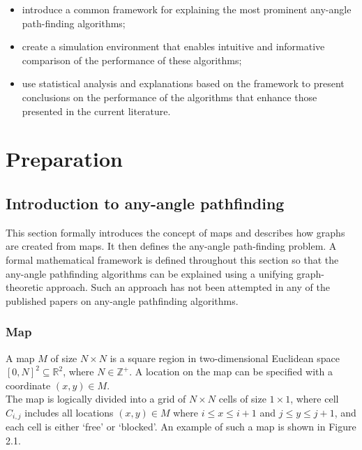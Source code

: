 \documentclass[12pt,notitlepage]{report}
\begin{document}
\begin{itemize}
\item introduce a common framework for explaining the most prominent any-angle path-finding algorithms;
\item create a simulation environment that enables intuitive and informative comparison of the performance of these algorithms;
\item use statistical analysis and explanations based on the framework to present conclusions on the performance of the algorithms that enhance those presented in the current literature.
\end {itemize}

\cleardoublepage

\chapter{Preparation} 

\section{Introduction to any-angle pathfinding}

This section formally introduces the concept of maps and describes how graphs are created from maps. It then defines the any-angle path-finding problem. A formal mathematical framework is defined throughout this section so that the any-angle pathfinding algorithms can be explained using a unifying graph-theoretic approach. Such an approach has not been attempted in any of the published papers on any-angle pathfinding algorithms.

\subsection{Map}

A map $M$ of size $N \times N$ is a square region in two-dimensional Euclidean space $[0,N]^{2} \subseteq \mathbb{R}^{2}$, where $N \in\mathbb{Z^+}$. A location on the map can be specified with a coordinate $(x,y) \in M$.\\

\noindent
The map is logically divided into a grid of $N \times N$ cells of size $1 \times 1$, where cell $C_{i,j}$ includes all locations $(x,y) \in M$ where $i \leq x \leq i+1$ and $j \leq y \leq j+1$, and each cell is either `free' or `blocked'. An example of such a map is shown in Figure 2.1.\\
\end{document}
